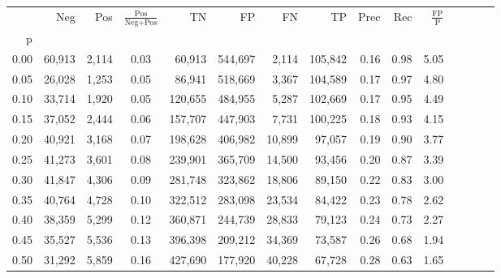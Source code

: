 \begin{tabular}{rrrcrrrrrrrrrrr}
\toprule
{} &     Neg &     Pos & $\frac{\text{Pos}}{\text{Neg}+\text{Pos}}$ &       TN &       FP &       FN &       TP &  Prec &   Rec & $\frac{\text{FP}}{\text{P}}$ \\
p    &         &         &                                            &          &          &          &          &       &       &                              \\
\midrule
0.00 &  60,913 &   2,114 &                                       0.03 &   60,913 &  544,697 &    2,114 &  105,842 &  0.16 &  0.98 &                         5.05 \\
0.05 &  26,028 &   1,253 &                                       0.05 &   86,941 &  518,669 &    3,367 &  104,589 &  0.17 &  0.97 &                         4.80 \\
0.10 &  33,714 &   1,920 &                                       0.05 &  120,655 &  484,955 &    5,287 &  102,669 &  0.17 &  0.95 &                         4.49 \\
0.15 &  37,052 &   2,444 &                                       0.06 &  157,707 &  447,903 &    7,731 &  100,225 &  0.18 &  0.93 &                         4.15 \\
0.20 &  40,921 &   3,168 &                                       0.07 &  198,628 &  406,982 &   10,899 &   97,057 &  0.19 &  0.90 &                         3.77 \\
0.25 &  41,273 &   3,601 &                                       0.08 &  239,901 &  365,709 &   14,500 &   93,456 &  0.20 &  0.87 &                         3.39 \\
0.30 &  41,847 &   4,306 &                                       0.09 &  281,748 &  323,862 &   18,806 &   89,150 &  0.22 &  0.83 &                         3.00 \\
0.35 &  40,764 &   4,728 &                                       0.10 &  322,512 &  283,098 &   23,534 &   84,422 &  0.23 &  0.78 &                         2.62 \\
0.40 &  38,359 &   5,299 &                                       0.12 &  360,871 &  244,739 &   28,833 &   79,123 &  0.24 &  0.73 &                         2.27 \\
0.45 &  35,527 &   5,536 &                                       0.13 &  396,398 &  209,212 &   34,369 &   73,587 &  0.26 &  0.68 &                         1.94 \\
0.50 &  31,292 &   5,859 &                                       0.16 &  427,690 &  177,920 &   40,228 &   67,728 &  0.28 &  0.63 &                         1.65 \\

\end{tabular}
